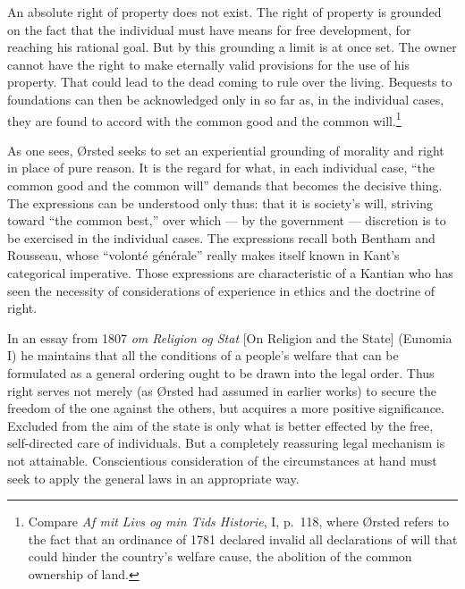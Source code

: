 \documentclass[12pt,a4paper]{book}
\newcommand{\opage}[1]{\marginnote{\footnotesize\textit{[#1]}}}
\begin{document}
An absolute right of property does not exist. The right of property is grounded on the
fact that the individual must have means for free development, for reaching his rational
goal. But by this grounding a limit is at once set. The owner cannot have the right to
make eternally valid provisions for the use of his property. That could lead to the dead
coming to rule over the living. Bequests to foundations can then be acknowledged only in
so far as, in the individual cases, they are found to accord with the common good and the
common will.\footnote{Compare \emph{Af mit Livs og min Tids Historie}, I, p.~118, where
Ørsted refers to the fact that an ordinance of 1781 declared invalid all declarations of
will that could hinder the country's welfare cause, the abolition of the common ownership
of land.}

As one sees, Ørsted seeks to set an experiential grounding of morality and right in place
of pure reason. It is the regard for what, in each individual case, ``the common good and
the common will'' demands that becomes the decisive thing. The expressions can be
understood only thus: that it is society's will, striving toward ``the common best,'' over
which --- by the government --- discretion is to be exercised in the individual cases. The
expressions recall both Bentham and Rousseau, whose ``volonté générale'' really makes
itself known in Kant's categorical imperative. Those expressions are \opage{77}characteristic of a
Kantian who has seen the necessity of considerations of experience in ethics and the
doctrine of right.

In an essay from 1807 \emph{om Religion og Stat} [On Religion and the State] (Eunomia I)
he maintains that all the conditions of a people's welfare that can be formulated as a
general ordering ought to be drawn into the legal order. Thus right serves not merely (as
Ørsted had assumed in earlier works) to secure the freedom of the one against the others,
but acquires a more positive significance. Excluded from the aim of the state is only what
is better effected by the free, self-directed care of individuals. But a completely
reassuring legal mechanism is not attainable. Conscientious consideration of the
circumstances at hand must seek to apply the general laws in an appropriate way.
\end{document}
